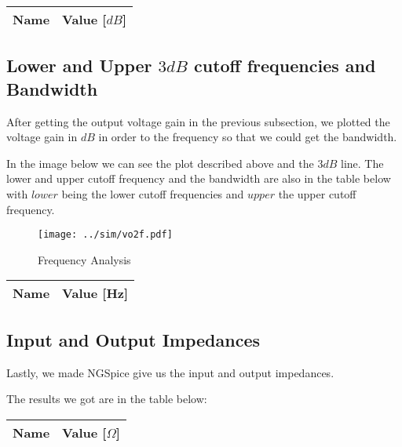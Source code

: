 \begin{table}[H]
  \centering
  \begin{tabular}{|l|r|}
    \hline    
    {\bf Name} & {\bf Value [$dB$]} \\ \hline
    
  \end{tabular}
  \label{tab:voltage}
\end{table}

\subsection{Lower and Upper $3dB$ cutoff frequencies and Bandwidth}
After getting the output voltage gain in the previous subsection, we plotted the voltage gain in $dB$ in order to the frequency so that we could get the bandwidth. \par
In the image below we can see the plot described above and the $3dB$ line. The lower and upper cutoff frequency and the bandwidth are also in the table below with $lower$ being the lower cutoff frequencies and $upper$ the upper cutoff frequency.

\begin{figure}[H] \centering
\texttt{[image: ../sim/vo2f.pdf]}
\caption{Frequency Analysis}
\label{fig:frequency}
\end{figure}

\begin{table}[H]
  \centering
  \begin{tabular}{|l|r|}
    \hline    
    {\bf Name} & {\bf Value [Hz]} \\ \hline
    
  \end{tabular}
  \label{tab:bandwidth}
\end{table}

\subsection{Input and Output Impedances}
Lastly, we made NGSpice give us the input and output impedances. \par
The results we got are in the table below: 

\begin{table}[H]
  \centering
  \begin{tabular}{|l|r|}
    \hline    
    {\bf Name} & {\bf Value [$\Omega$]} \\ \hline
    
  \end{tabular}
  \label{tab:impedance}
\end{table}


